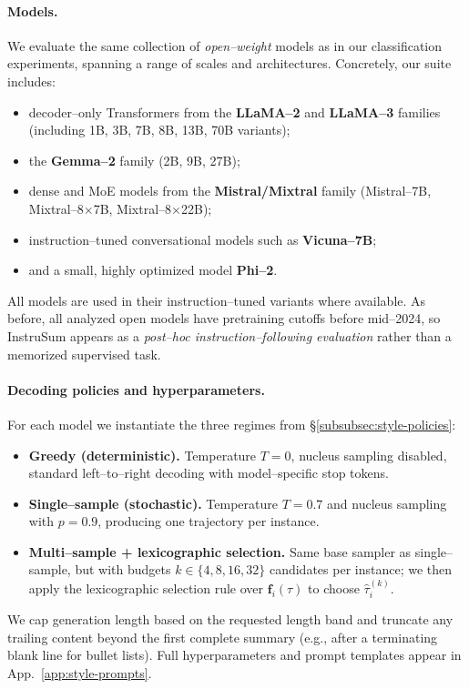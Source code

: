 \paragraph{Models.}
We evaluate the same collection of \emph{open--weight} models as in our
classification experiments, spanning a range of scales and
architectures. Concretely, our suite includes:
\begin{itemize}[leftmargin=1.5em,noitemsep]
  \item decoder--only Transformers from the \textbf{LLaMA--2} and
        \textbf{LLaMA--3} families (including 1B, 3B, 7B, 8B, 13B,
        70B variants);
  \item the \textbf{Gemma--2} family (2B, 9B, 27B);
  \item dense and MoE models from the \textbf{Mistral/Mixtral} family
        (Mistral--7B, Mixtral--8$\times$7B, Mixtral--8$\times$22B);
  \item instruction--tuned conversational models such as
        \textbf{Vicuna--7B};
  \item and a small, highly optimized model \textbf{Phi--2}.
\end{itemize}
All models are used in their instruction--tuned variants where
available. As before, all analyzed open models have pretraining cutoffs
before mid--2024, so InstruSum appears as a \emph{post--hoc
instruction--following evaluation} rather than a memorized supervised
task.

\paragraph{Decoding policies and hyperparameters.}
For each model we instantiate the three regimes from
\S\ref{subsubsec:style-policies}:
\begin{itemize}[leftmargin=1.5em,noitemsep]
  \item \textbf{Greedy (deterministic).}
        Temperature $T{=}0$, nucleus sampling disabled, standard
        left--to--right decoding with model--specific stop tokens.
  \item \textbf{Single--sample (stochastic).}
        Temperature $T{=}0.7$ and nucleus sampling with $p{=}0.9$,
        producing one trajectory per instance.
  \item \textbf{Multi--sample + lexicographic selection.}
        Same base sampler as single--sample, but with budgets
        $k \in \{4, 8, 16, 32\}$ candidates per instance; we then apply
        the lexicographic selection rule over $\mathbf{f}_i(\tau)$ to
        choose $\hat{\tau}_i^{(k)}$.
\end{itemize}
We cap generation length based on the requested length band and truncate
any trailing content beyond the first complete summary (e.g., after a
terminating blank line for bullet lists). Full hyperparameters and
prompt templates appear in App.~\ref{app:style-prompts}.


